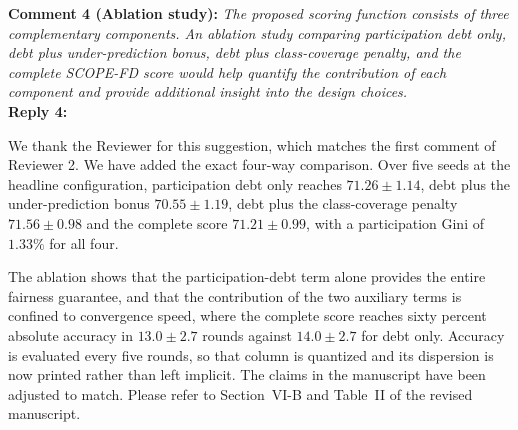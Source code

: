 \documentclass[10pt]{article}
\begin{document}
\noindent
\textbf{Comment 4 (Ablation study):} \textit{The proposed scoring function consists of three complementary components. An ablation study comparing participation debt only, debt plus under-prediction bonus, debt plus class-coverage penalty, and the complete SCOPE-FD score would help quantify the contribution of each component and provide additional insight into the design choices.} \\
\noindent
\textbf{Reply 4:} {We thank the Reviewer for this suggestion, which matches the first comment of Reviewer 2. We have added the exact four-way comparison. Over five seeds at the headline configuration, participation debt only reaches $71.26 \pm 1.14$, debt plus the under-prediction bonus $70.55 \pm 1.19$, debt plus the class-coverage penalty $71.56 \pm 0.98$ and the complete score $71.21 \pm 0.99$, with a participation Gini of $1.33\%$ for all four.

The ablation shows that the participation-debt term alone provides the entire fairness guarantee, and that the contribution of the two auxiliary terms is confined to convergence speed, where the complete score reaches sixty percent absolute accuracy in $13.0 \pm 2.7$ rounds against $14.0 \pm 2.7$ for debt only. Accuracy is evaluated every five rounds, so that column is quantized and its dispersion is now printed rather than left implicit. The claims in the manuscript have been adjusted to match. Please refer to Section~VI-B and Table~II of the revised manuscript.}\\
\end{document}
